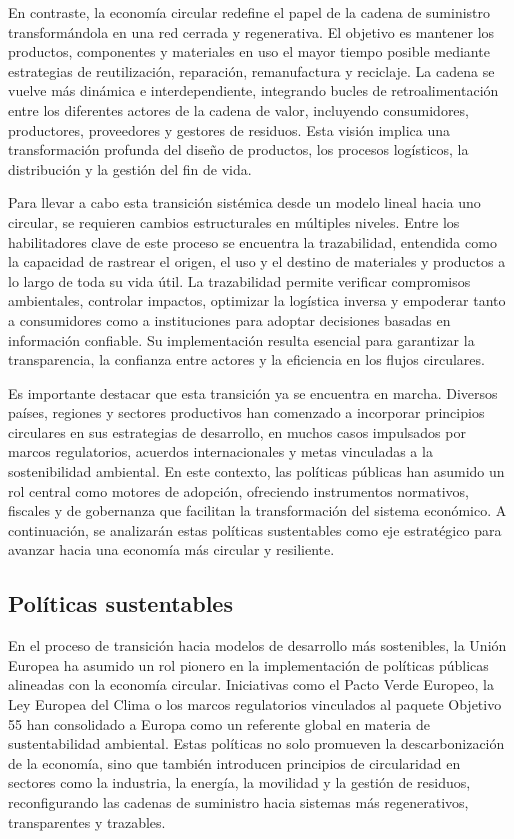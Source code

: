 En contraste, la economía circular redefine el papel de la cadena de suministro transformándola en una red cerrada y regenerativa. El objetivo es mantener los productos, componentes y materiales en uso el mayor tiempo posible mediante estrategias de reutilización, reparación, remanufactura y reciclaje. La cadena se vuelve más dinámica e interdependiente, integrando bucles de retroalimentación entre los diferentes actores de la cadena de valor, incluyendo consumidores, productores, proveedores y gestores de residuos. Esta visión implica una transformación profunda del diseño de productos, los procesos logísticos, la distribución y la gestión del fin de vida.

Para llevar a cabo esta transición sistémica desde un modelo lineal hacia uno circular, se requieren cambios estructurales en múltiples niveles. Entre los habilitadores clave de este proceso se encuentra la trazabilidad, entendida como la capacidad de rastrear el origen, el uso y el destino de materiales y productos a lo largo de toda su vida útil. La trazabilidad permite verificar compromisos ambientales, controlar impactos, optimizar la logística inversa y empoderar tanto a consumidores como a instituciones para adoptar decisiones basadas en información confiable. Su implementación resulta esencial para garantizar la transparencia, la confianza entre actores y la eficiencia en los flujos circulares.

Es importante destacar que esta transición ya se encuentra en marcha. Diversos países, regiones y sectores productivos han comenzado a incorporar principios circulares en sus estrategias de desarrollo, en muchos casos impulsados por marcos regulatorios, acuerdos internacionales y metas vinculadas a la sostenibilidad ambiental. En este contexto, las políticas públicas han asumido un rol central como motores de adopción, ofreciendo instrumentos normativos, fiscales y de gobernanza que facilitan la transformación del sistema económico. A continuación, se analizarán estas políticas sustentables como eje estratégico para avanzar hacia una economía más circular y resiliente.

\subsection{Políticas sustentables}

En el proceso de transición hacia modelos de desarrollo más sostenibles, la Unión Europea ha asumido un rol pionero en la implementación de políticas públicas alineadas con la economía circular. Iniciativas como el Pacto Verde Europeo, la Ley Europea del Clima o los marcos regulatorios vinculados al paquete Objetivo 55 han consolidado a Europa como un referente global en materia de sustentabilidad ambiental. Estas políticas no solo promueven la descarbonización de la economía, sino que también introducen principios de circularidad en sectores como la industria, la energía, la movilidad y la gestión de residuos, reconfigurando las cadenas de suministro hacia sistemas más regenerativos, transparentes y trazables.

